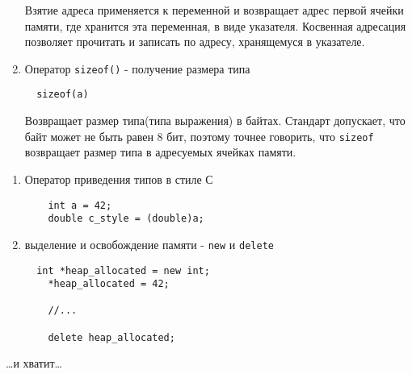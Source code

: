\begin{enumerate}
  Взятие адреса применяется к переменной и возвращает адрес первой
  ячейки памяти, где хранится эта переменная, в виде указателя.
  Косвенная адресация позволяет прочитать и записать по адресу,
  хранящемуся в указателе.
\item
  Оператор \texttt{sizeof()} - получение размера типа

\begin{Verbatim}
  sizeof(a)
\end{Verbatim}
  Возвращает размер типа(типа выражения) в байтах. Стандарт допускает,
  что байт может не быть равен 8 бит, поэтому точнее говорить, что
  \texttt{sizeof} возвращает размер типа в адресуемых ячейках памяти.
\end{enumerate}

\begin{enumerate}
\def\labelenumi{\arabic{enumi})}
\setcounter{enumi}{6}
\item
  Оператор приведения типов в стиле С
  \begin{Verbatim}
    int a = 42;
    double c_style = (double)a;
  \end{Verbatim}
\item
  выделение и освобождение памяти - \texttt{new} и \texttt{delete}

\begin{Verbatim}
  int *heap_allocated = new int;
    *heap_allocated = 42;

    //...

    delete heap_allocated;
\end{Verbatim}
\end{enumerate}

\ldots и хватит\ldots{}
